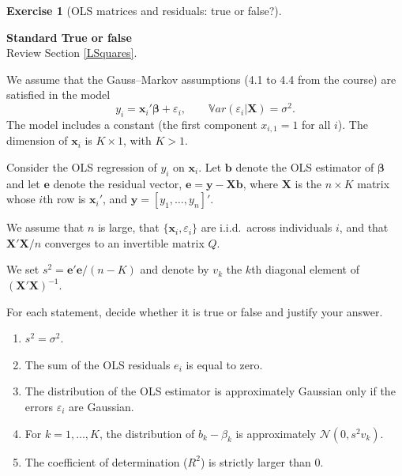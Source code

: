 \documentclass[
  11pt,
]{book}
\theoremstyle{definition}
\theoremstyle{definition}
\theoremstyle{definition}
\newtheorem{exercise}{Exercise}[chapter]
\theoremstyle{definition}
\theoremstyle{remark}
\begin{document}
\begin{exercisebox}

\begin{exercise}[OLS matrices and residuals: true or false?]
\protect\hypertarget{exr:regressions-ols-matrix-true-false}{}\label{exr:regressions-ols-matrix-true-false}

\textbf{Standard \textbar{} True or false}\\
Review Section \ref{LSquares}.

We assume that the Gauss--Markov assumptions (4.1 to 4.4 from the course) are satisfied in the model \[y_i=\mathbf{x}_i'\boldsymbol\beta+\varepsilon_i,
\qquad
\mathbb{V}ar(\varepsilon_i|\mathbf{X})=\sigma^2.\] The model includes a constant (the first component \(x_{i,1}=1\) for all \(i\)). The dimension of \(\mathbf{x}_i\) is \(K\times 1\), with \(K>1\).

Consider the OLS regression of \(y_i\) on \(\mathbf{x}_i\). Let \(\mathbf{b}\) denote the OLS estimator of \(\boldsymbol\beta\) and let \(\mathbf{e}\) denote the residual vector, \(\mathbf{e}=\mathbf{y}-\mathbf{X}\mathbf{b}\), where \(\mathbf{X}\) is the \(n\times K\) matrix whose \(i\)th row is \(\mathbf{x}_i'\), and \(\mathbf{y}=[y_1,\dots,y_n]'\).

We assume that \(n\) is large, that \(\{\mathbf{x}_i,\varepsilon_i\}\) are i.i.d.~across individuals \(i\), and that \(\mathbf{X}'\mathbf{X}/n\) converges to an invertible matrix \(Q\).

We set \(s^2=\mathbf{e}'\mathbf{e}/(n-K)\) and denote by \(v_k\) the \(k\)th diagonal element of \((\mathbf{X}'\mathbf{X})^{-1}\).

For each statement, decide whether it is true or false and justify your answer.

\begin{enumerate}
\def\labelenumi{\arabic{enumi}.}
\item
  \(s^2=\sigma^2\).
\item
  The sum of the OLS residuals \(e_i\) is equal to zero.
\item
  The distribution of the OLS estimator is approximately Gaussian only if the errors \(\varepsilon_i\) are Gaussian.
\item
  For \(k=1,\dots,K\), the distribution of \(b_k-\beta_k\) is approximately \(\mathcal{N}(0,s^2 v_k)\).
\item
  The coefficient of determination (\(R^2\)) is strictly larger than 0.
\end{enumerate}

\end{exercise}

\end{exercisebox}
\end{document}
